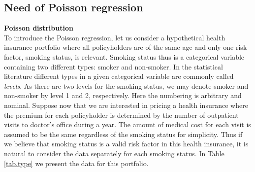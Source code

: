 \documentclass[12pt]{article}
\begin{document}
\subsection{Need of Poisson regression}\label{Need.Poi.reg}

\noindent\textbf{Poisson distribution\\}
To introduce the Poisson regression, let us consider a hypothetical health insurance portfolio where all policyholders are of the same age and only one risk factor, smoking status, is relevant. Smoking status thus is a categorical variable containing two different types: smoker and non-smoker. In the statistical literature different types in a given categorical variable are commonly called \textit{levels}. As there are two levels for the smoking status, we may denote smoker and non-smoker by level 1 and 2, respectively. Here the numbering is arbitrary and nominal. Suppose now that we are interested in pricing a health insurance where the premium for each policyholder is determined by the number of outpatient visits to doctor's office during a year. The amount of medical cost for each visit is assumed to be the same regardless of the smoking status for simplicity. Thus if we believe that smoking status is a valid risk factor in this health insurance, it is natural to consider the data separately for each smoking status. In Table \ref{tab.type} we present the data for this portfolio.
%
\end{document}
